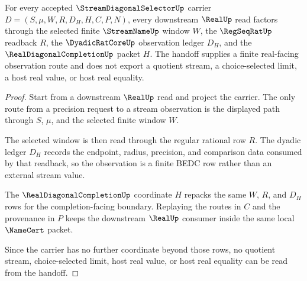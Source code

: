 \begin{theorem}
\label{thm:stream-diagonal-selector-real-handoff}
For every accepted $\StreamDiagonalSelectorUp$ carrier $D=(S,\mu,W,R,D_H,H,C,P,N)$, every downstream $\RealUp$ read factors through the selected finite $\StreamNameUp$ window $W$, the $\RegSeqRatUp$ readback $R$, the $\DyadicRatCoreUp$ observation ledger $D_H$, and the $\RealDiagonalCompletionUp$ packet $H$. The handoff supplies a finite real-facing observation route and does not export a quotient stream, a choice-selected limit, a host real value, or host real equality.
\end{theorem}
\begin{proof}
Start from a downstream $\RealUp$ read and project the carrier. The only route from a precision request to a stream observation is the displayed path through $S$, $\mu$, and the selected finite window $W$.

The selected window is then read through the regular rational row $R$. The dyadic ledger $D_H$ records the endpoint, radius, precision, and comparison data consumed by that readback, so the observation is a finite BEDC row rather than an external stream value.

The $\RealDiagonalCompletionUp$ coordinate $H$ repacks the same $W$, $R$, and $D_H$ rows for the completion-facing boundary. Replaying the routes in $C$ and the provenance in $P$ keeps the downstream $\RealUp$ consumer inside the same local $\NameCert$ packet.

Since the carrier has no further coordinate beyond those rows, no quotient stream, choice-selected limit, host real value, or host real equality can be read from the handoff.
\end{proof}

